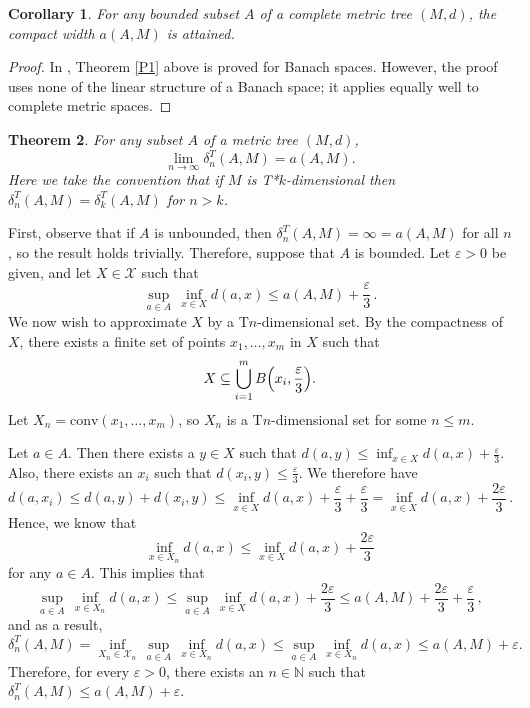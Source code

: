 \documentclass{bcp92}
\theoremstyle{plain}
\newtheorem{thm}{Theorem}[section]
\newtheorem{cor}[thm]{Corollary}
\theoremstyle{definition}
\begin{document}
\begin{cor} \label{tree-attained}
For any bounded subset $A$ of a complete metric tree $(M,d)$, the compact width
$a(A,M)$ is attained.
\end{cor}

\begin{proof}
In \cite{kamal}, Theorem \ref{P1} above is proved for Banach spaces. However,
the proof uses none of the linear structure of a Banach space; it applies
equally well to complete metric spaces.
\end{proof}

\begin{thm} \label{lim-delta}
For any subset $A$ of a metric tree $(M,d)$,
$$
\lim_{n \rightarrow \infty}{\delta_n^T(A,M)} = a(A,M).
$$
Here we take the convention
that if $M$ is {\rm T*}$k$-dimensional then $\delta_n^T(A,M) =
\delta_k^T(A,M)$ for $n > k$.
\end{thm}

\proof
First, observe that if $A$ is unbounded, then $\delta_n^T(A,M) = \infty =
a(A,M)$ for all $n$, so the result holds trivially. Therefore, suppose that
$A$ is bounded. Let $\varepsilon > 0$ be given, and let $X \in \mathcal{X}$
such that
$$
\sup_{a \in A} \,\inf_{x \in X} d(a,x) \leq a(A,M) + \frac{\varepsilon}{3}\,.
$$
We now wish to approximate $X$ by a T$n$-dimensional set. By the compactness
of $X$, there exists a finite set of points $x_1, \dots, x_{m}$ in $X$ such
that
$$
X \subseteq \bigcup_{i=1}^{m}B\Bigl(x_i,\frac{\varepsilon}{3}\Bigr).
$$
Let $X_n = \text{conv}(x_1, \dots, x_{m})$, so $X_n$ is a T$n$-dimensional
set for some $n \leq m$.

Let $a \in A$. Then there exists a $y \in X$ such that $d(a,y) \leq \inf_{x
\in X} d(a,x) + \frac{\varepsilon}{3}$. Also, there exists an $x_i$ such that
$d(x_i,y) \leq \frac{\varepsilon}{3}$. We therefore have
$$
d(a,x_i) \leq d(a,y) + d(x_i,y) \leq \inf_{x \in X} d(a,x) +
\frac{\varepsilon}{3} + \frac{\varepsilon}{3} = \inf_{x \in X} d(a,x) +
\frac{2 \varepsilon}{3}\,.
$$
Hence, we know that
$$
\inf_{x \in X_n} d(a,x) \leq \inf_{x \in X} d(a,x) + \frac{2 \varepsilon}{3}
$$
for any $a \in A$. This implies that
$$
\sup_{a \in A} \,\inf_{x \in X_n} d(a,x) \leq
\sup_{a \in A} \,\inf_{x \in X} d(a,x) + \frac{2 \varepsilon}{3} \leq a(A,M)
+ \frac{2 \varepsilon}{3} + \frac{\varepsilon}{3}\, ,
$$
and as a result,
$$
\delta_n^T(A,M) = \inf_{X_n \in \mathcal{X}_n} \,\sup_{a \in A} \,\inf_{x \in
X_n} d(a,x) \leq
\sup_{a \in A} \,\inf_{x \in X_n} d(a,x) \leq a(A,M) + \varepsilon.
$$
Therefore, for every $\varepsilon > 0$, there exists an $n \in \mathbb{N}$
such that $\delta_n^T(A,M) \leq a(A,M) + \varepsilon$.
\end{document}
